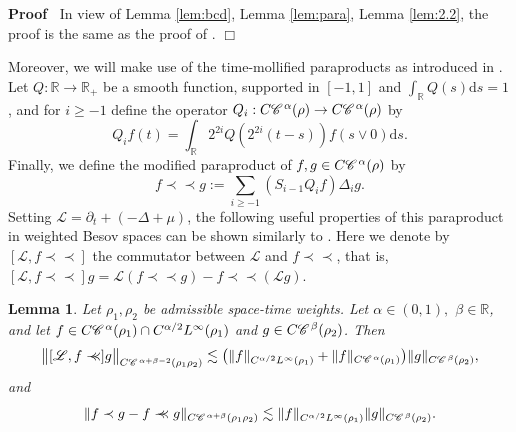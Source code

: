 \documentclass[a4paper,11pt]{article}
\renewcommand{\geq}{\geqslant}
\newenvironment{proof}{\noindent\textbf{Proof\ }}{\hspace*{\fill}$\Box$\medskip}
\newtheorem{lemma}[theorem]{Lemma}
\numberwithin{equation}{section}
\newcommand{\CC}{\mathscr{C} \hspace{.1em}}
\newcommand{\LL}{\mathscr{L}}
\newcommand{\R}{\mathbb{R}}
\newcommand{\Prec}{\prec\!\!\!\prec}
\newcommand{\8}{\infty}
\begin{document}
\begin{proof}
In view of Lemma \ref{lem:bcd}, Lemma \ref{lem:para}, Lemma \ref{lem:2.2}, the proof is the same as the proof of \cite[Lemma 2.4]{GIP}.
\end{proof}


%
%



Moreover, we will make use of the time-mollified paraproducts as introduced in \cite[Section 5]{GIP}. Let $Q:\R\to\R_{+}$ be a smooth function, supported in $[-1,1]$ and $\int_{\R}Q(s)\mathrm{d}s=1$, and for $i\geq -1$ define the operator $Q_{i}:C\CC^{\alpha}(\rho)\to C\CC^{\alpha}(\rho)$ by
$$
Q_{i}f(t)=\int_{\R}2^{2i}Q(2^{2i}(t-s))f(s\vee 0)\mathrm{d} s.
$$
Finally, we define the modified paraproduct of $f,g\in C\CC^{\alpha}(\rho)$ by
$$
f\Prec g := \sum_{i\geq -1}(S_{i-1}Q_{i}f)\Delta_{i} g.
$$
Setting  $\LL=\partial_{t} +(-\Delta+\mu)$, the following useful properties of this paraproduct in weighted Besov spaces  can be shown similarly to \cite[Lemma 5.1]{GIP}. Here we denote by $[\LL,f\Prec]$ the commutator between $\LL$ and $f\Prec$, that is, $[\LL,f\Prec]g=\LL (f\Prec g) -f\Prec(\LL g)$.

\begin{lemma}\label{lem:5.1}
Let $\rho_{1},\rho_{2}$ be admissible space-time  weights. Let $\alpha\in (0,1),$ $\beta\in \R$, and let $f\in C\CC^{\alpha}(\rho_{1})\cap C^{\alpha/2}L^{\infty}(\rho_{1})$ and $g\in C\CC^{\beta}(\rho_{2})$. Then
$$
\big\|[\LL,f\Prec] g\big\|_{C\CC^{\alpha+\beta-2}(\rho_{1}\rho_{2})}\lesssim \big( \|f\|_{C^{\alpha/2}L^{\infty}(\rho_{1})}+\|f\|_{C\CC^{\alpha}(\rho_{1})} \big)\|g\|_{C\CC^{\beta}(\rho_{2})},
$$
and
$$
\|f\prec g-f\Prec g\|_{C\CC^{\alpha+\beta}(\rho_{1}\rho_{2})}\lesssim \|f\|_{C^{\alpha/2}L^{\infty}(\rho_{1})}\|g\|_{C\CC^{\beta}(\rho_{2})}.
$$
\end{lemma}
\end{document}
